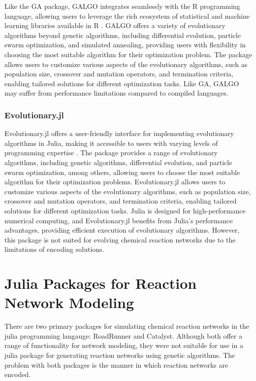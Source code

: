 \documentclass[12pt]{report}
\begin{document}
Like the GA package, GALGO integrates seamlessly with the R programming language, allowing users to leverage the rich ecosystem of statistical and machine learning libraries available in R \cite{Trevino2006}. GALGO offers a variety of evolutionary algorithms beyond genetic algorithms, including differential evolution, particle swarm optimization, and simulated annealing, providing users with flexibility in choosing the most suitable algorithm for their optimization problem. The package allows users to customize various aspects of the evolutionary algorithms, such as population size, crossover and mutation operators, and termination criteria, enabling tailored solutions for different optimization tasks. Like GA, GALGO may suffer from performance limitations compared to compiled languages.

\subsubsection{Evolutionary.jl}
Evolutionary.jl offers a user-friendly interface for implementing evolutionary algorithms in Julia, making it accessible to users with varying levels of programming expertise \cite{evolutionary.jl}. The package provides a range of evolutionary algorithms, including genetic algorithms, differential evolution, and particle swarm optimization, among others, allowing users to choose the most suitable algorithm for their optimization problems. Evolutionary.jl allows users to customize various aspects of the evolutionary algorithms, such as population size, crossover and mutation operators, and termination criteria, enabling tailored solutions for different optimization tasks. Julia is designed for high-performance numerical computing, and Evolutionary.jl benefits from Julia's performance advantages, providing efficient execution of evolutionary algorithms. However, this package is not suited for evolving chemical reaction networks due to the limitations of encoding solutions.

\section{Julia Packages for Reaction Network Modeling}
\label{section:tools_networks}
There are two primary packages for simulating chemical reaction networks in the julia programming langauge: RoadRunner and Catalyst. Although both offer a range of functionality for network modeling, they were not suitable for use in a julia package for generating reaction networks using genetic algorithms. The problem with both packages is the manner in which reaction networks are encoded.
\end{document}
